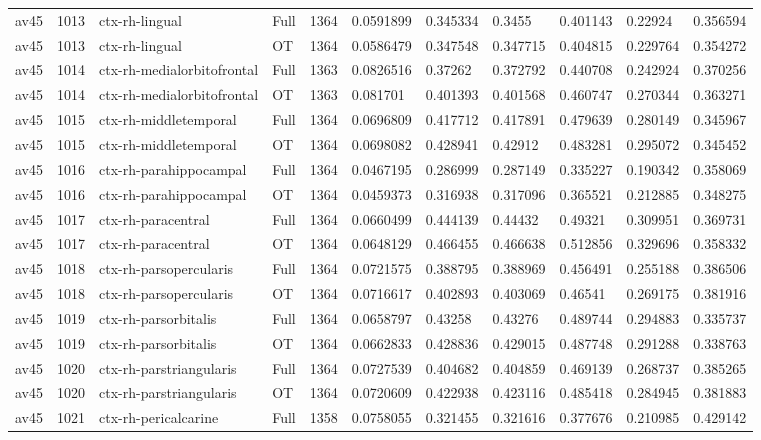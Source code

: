 \begin{landscape}
\begin{longtable}{lllllllllll}
av45 & 1013 & ctx-rh-lingual & Full & 1364 & 0.0591899 & 0.345334 & 0.3455 & 0.401143 & 0.22924 & 0.356594 \\
av45 & 1013 & ctx-rh-lingual & OT & 1364 & 0.0586479 & 0.347548 & 0.347715 & 0.404815 & 0.229764 & 0.354272 \\
av45 & 1014 & ctx-rh-medialorbitofrontal & Full & 1363 & 0.0826516 & 0.37262 & 0.372792 & 0.440708 & 0.242924 & 0.370256 \\
av45 & 1014 & ctx-rh-medialorbitofrontal & OT & 1363 & 0.081701 & 0.401393 & 0.401568 & 0.460747 & 0.270344 & 0.363271 \\
av45 & 1015 & ctx-rh-middletemporal & Full & 1364 & 0.0696809 & 0.417712 & 0.417891 & 0.479639 & 0.280149 & 0.345967 \\
av45 & 1015 & ctx-rh-middletemporal & OT & 1364 & 0.0698082 & 0.428941 & 0.42912 & 0.483281 & 0.295072 & 0.345452 \\
av45 & 1016 & ctx-rh-parahippocampal & Full & 1364 & 0.0467195 & 0.286999 & 0.287149 & 0.335227 & 0.190342 & 0.358069 \\
av45 & 1016 & ctx-rh-parahippocampal & OT & 1364 & 0.0459373 & 0.316938 & 0.317096 & 0.365521 & 0.212885 & 0.348275 \\
av45 & 1017 & ctx-rh-paracentral & Full & 1364 & 0.0660499 & 0.444139 & 0.44432 & 0.49321 & 0.309951 & 0.369731 \\
av45 & 1017 & ctx-rh-paracentral & OT & 1364 & 0.0648129 & 0.466455 & 0.466638 & 0.512856 & 0.329696 & 0.358332 \\
av45 & 1018 & ctx-rh-parsopercularis & Full & 1364 & 0.0721575 & 0.388795 & 0.388969 & 0.456491 & 0.255188 & 0.386506 \\
av45 & 1018 & ctx-rh-parsopercularis & OT & 1364 & 0.0716617 & 0.402893 & 0.403069 & 0.46541 & 0.269175 & 0.381916 \\
av45 & 1019 & ctx-rh-parsorbitalis & Full & 1364 & 0.0658797 & 0.43258 & 0.43276 & 0.489744 & 0.294883 & 0.335737 \\
av45 & 1019 & ctx-rh-parsorbitalis & OT & 1364 & 0.0662833 & 0.428836 & 0.429015 & 0.487748 & 0.291288 & 0.338763 \\
av45 & 1020 & ctx-rh-parstriangularis & Full & 1364 & 0.0727539 & 0.404682 & 0.404859 & 0.469139 & 0.268737 & 0.385265 \\
av45 & 1020 & ctx-rh-parstriangularis & OT & 1364 & 0.0720609 & 0.422938 & 0.423116 & 0.485418 & 0.284945 & 0.381883 \\
av45 & 1021 & ctx-rh-pericalcarine & Full & 1358 & 0.0758055 & 0.321455 & 0.321616 & 0.377676 & 0.210985 & 0.429142 \\

\end{longtable}
\end{landscape}

